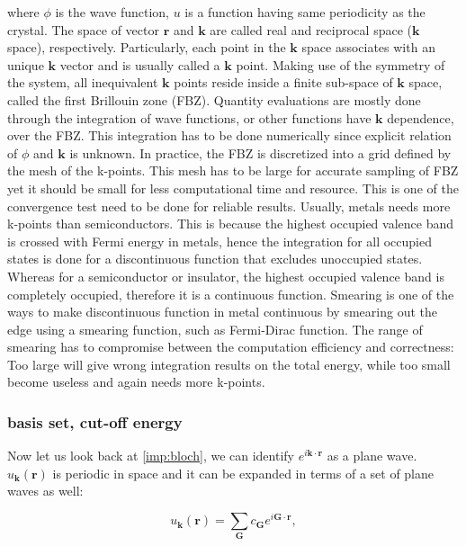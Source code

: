 where $\phi$ is the wave function, $u$ is a function having same periodicity as the crystal. The space of vector $\mathbf{r}$ and $\mathbf{k}$ are called real and reciprocal space ($\mathbf{k}$ space), respectively. Particularly, each point in the $\mathbf{k}$ space associates with an unique $\mathbf{k}$ vector and is usually called a $\mathbf{k}$ point. Making use of the symmetry of the system, all inequivalent $\mathbf{k}$ points reside inside a finite sub-space of $\mathbf{k}$ space, called the first Brillouin zone (FBZ). Quantity evaluations are mostly done through the integration of wave functions, or other functions have $\mathbf{k}$ dependence, over the FBZ. This integration has to be done numerically since explicit relation of $\phi$ and $\mathbf{k}$ is unknown. In practice, the FBZ is discretized into a grid defined by the mesh of the k-points. This mesh has to be large for accurate sampling of FBZ yet it should be small for less computational time and resource. This is one of the convergence test need to be done for reliable results. Usually, metals needs more k-points than semiconductors. This is because the highest occupied valence band is crossed with Fermi energy in metals, hence the integration for all occupied states is done for a discontinuous function that excludes unoccupied states.  Whereas for a semiconductor or insulator, the highest occupied valence band is completely occupied, therefore it is a continuous function. Smearing is one of the ways to make discontinuous function in metal continuous by smearing out the edge using a smearing function, such as Fermi-Dirac function. The range of smearing has to compromise between the computation efficiency and correctness: Too large will give wrong integration results on the total energy, while too small become useless and again needs more k-points.

\subsubsection{basis set, cut-off energy }

Now let us look back at \autoref{imp:bloch}, we can identify $e^{i\mathbf{k}\cdot\mathbf{r}}$ as a plane wave. $u_{\mathbf{k}}(\mathbf{r})$ is periodic in space and it can be expanded in terms of a set of plane waves as well:

\begin{equation}
u_{\mathbf{k}}(\mathbf{r})=\sum_{\mathbf{G}}c_{\mathbf{G}}e^{i\mathbf{G}\cdot\mathbf{r}},
\end{equation}

